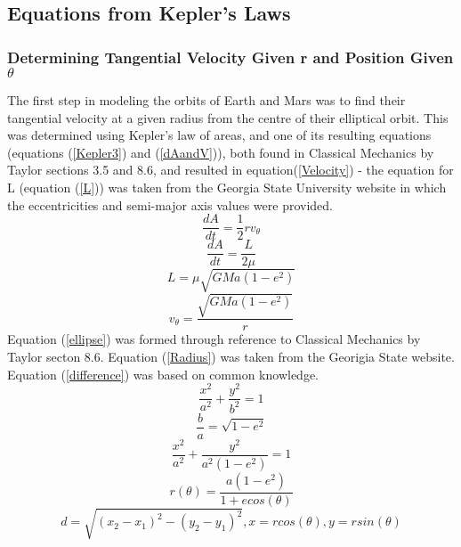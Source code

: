 %
\subsection{Equations from Kepler's Laws}
\subsubsection{Determining Tangential Velocity Given r and Position Given $\theta$}
\label{VelocitySection}
The first step in modeling the orbits of Earth and Mars was to find their tangential velocity at a given radius from
the centre of their elliptical orbit. This was determined using Kepler's law of areas, and one of its resulting 
equations (equations (\ref{Kepler3}) and (\ref{dAandV})), both found in Classical Mechanics by Taylor sections 3.5 and 
8.6, and resulted in equation(\ref{Velocity}) - the equation for L (equation (\ref{L})) was taken from the Georgia State University website in which the eccentricities and semi-major axis values were provided. 
\begin{equation}
	\frac{dA}{dt} = \frac{1}{2}rv_{\theta}
	\label{Kepler3}
\end{equation}
\begin{equation}
	\frac{dA}{dt} = \frac{L}{2\mu}
	\label{dAandV}
\end{equation}
\begin{equation}
	L =\mu\sqrt{GMa(1-e^2)}
	\label{L}
\end{equation}
\begin{equation}
	v_{\theta} = \frac{\sqrt{GMa(1-e^2)}}{r}
	\label{Velocity}
\end{equation}
Equation (\ref{ellipse}) was formed through reference to Classical Mechanics by Taylor secton 8.6. 
Equation (\ref{Radius}) was taken from the Georigia State website. Equation (\ref{difference}) was based on common
knowledge. 
\begin{equation}
	\frac{x^2}{a^2}+\frac{y^2}{b^2} = 1
\end{equation}
\begin{equation}
	\frac{b}{a} = \sqrt{1-e^2}
\end{equation}
\begin{equation}
	\frac{x^2}{a^2}+\frac{y^2}{a^2(1-e^2)} = 1
	\label{ellipse}
\end{equation}
\begin{equation}
	r(\theta) = \frac{a(1-e^2)}{1+ecos(\theta)}
	\label{Radius}
\end{equation}
\begin{equation}
	d = \sqrt{(x_{2} - x_{1})^2-(y_{2}-y_{1})^2}, x = rcos(\theta), y = rsin(\theta)
	\label{difference}
\end{equation}
